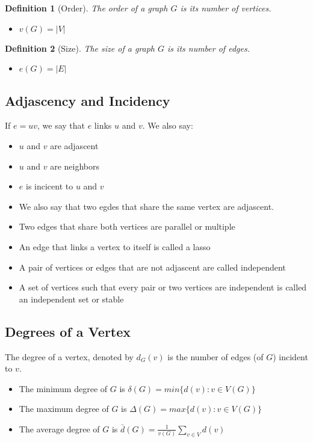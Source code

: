 \documentclass{article}
\newtheorem{definition}{Definition}[section]
\begin{document}
\begin{definition}[Order]
\label{def:order}
	The order of a graph $G$  is its number of vertices.
	\begin{itemize}
		\item $v(G) = |V|$
	\end{itemize}
\end{definition}


\begin{definition}[Size]
	\label{def:size}
	The size of  a graph $G$  is its number of edges.
	\begin{itemize}
		\item $e(G) = |E|$
	\end{itemize}
\end{definition}


\subsection{Adjascency and Incidency}

If $e = uv$, we say that $e$ links $u$ and $v$. We also say:

\begin{itemize}
	\item $u$ and $v$ are adjascent
	\item $u$ and $v$ are neighbors
	\item $e$ is incicent to $u$ and $v$
	\item We also say that two egdes that share the same vertex are adjascent. 
	\item Two edges that share both vertices are parallel or multiple
	\item An edge that links a vertex to itself is called a lasso
	\item A pair of vertices or edges that are not adjascent are called independent
	\item A set of vertices such that every pair or two vertices are independent is called an independent set or stable
\end{itemize}


\subsection{Degrees of a Vertex}

The degree of a vertex, denoted by $d_G(v)$ is the number of edges (of $G$) incident to $v$.

\begin{itemize}
	\item The minimum degree of $G$ is $\delta(G) = min\{d(v) :  v \in V(G)\}$
	\item The maximum degree of $G$ is $\Delta(G) = max\{d(v) :  v \in V(G)\}$
	\item The average degree of $G$ is $\bar{d}(G) = \frac{1}{v(G)} \sum_{v \in V} d(v)$
\end{itemize}
\end{document}
